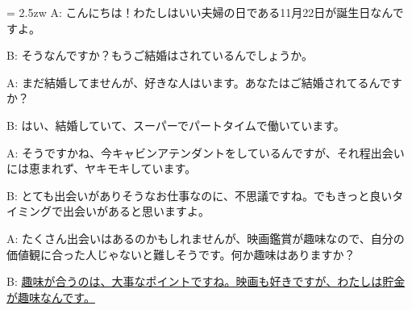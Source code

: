 \documentclass[11pt]{amsart}
\title{}
\author{}
\newenvironment{hangall}[1]{\hangindent = 2.5zw\everypar{\hangindent = 2.5zw}}{}
\begin{document}
\maketitle
\begin{hangall}{}%
A: こんにちは！わたしはいい夫婦の日である11月22日が誕生日なんですよ。

B: そうなんですか？もうご結婚はされているんでしょうか。

A: まだ結婚してませんが、好きな人はいます。あなたはご結婚されてるんですか？

B: はい、結婚していて、スーパーでパートタイムで働いています。

A: そうですかね、今キャビンアテンダントをしているんですが、それ程出会いには恵まれず、ヤキモキしています。

B: とても出会いがありそうなお仕事なのに、不思議ですね。でもきっと良いタイミングで出会いがあると思いますよ。

A: たくさん出会いはあるのかもしれませんが、映画鑑賞が趣味なので、自分の価値観に合った人じゃないと難しそうです。何か趣味はありますか？

B: \ul{趣味が合うのは、大事なポイントですね。映画も好きですが、わたしは貯金が趣味なんです。}\end{hangall}
\end{document}
